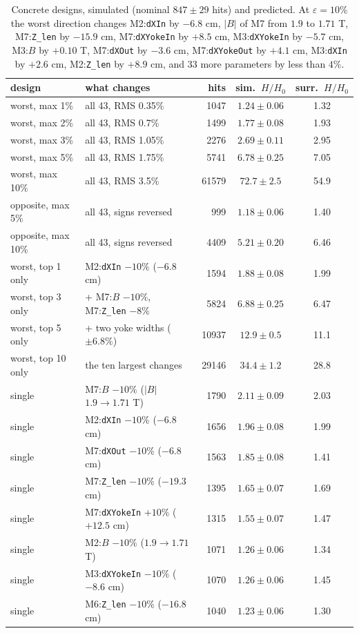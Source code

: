 \documentclass[11pt,a4paper]{article}
\newcommand{\HH}{H/H_0}
\begin{document}
\begin{table}[t]
\centering
\caption{Concrete designs, simulated (nominal $847\pm29$ hits) and predicted. At
$\varepsilon=10\%$ the worst direction changes M2:\texttt{dXIn} by $-6.8$ cm, $|B|$ of M7 from
$1.9$ to $1.71$ T, M7:\texttt{Z\_len} by $-15.9$ cm, M7:\texttt{dXYokeIn} by $+8.5$ cm,
M3:\texttt{dXYokeIn} by $-5.7$ cm, M3:$B$ by $+0.10$ T, M7:\texttt{dXOut} by $-3.6$ cm,
M7:\texttt{dXYokeOut} by $+4.1$ cm, M3:\texttt{dXIn} by $+2.6$ cm, M2:\texttt{Z\_len} by $+8.9$ cm,
and 33 more parameters by less than $4\%$.}
\label{tab:concrete}
\small
\begin{tabular}{llrcc}
\toprule
design & what changes & hits & sim.\ $\HH$ & surr.\ $\HH$ \\
\midrule
worst, max 1\%   & all 43, RMS 0.35\% & 1047  & $1.24\pm0.06$ & 1.32 \\
worst, max 2\%   & all 43, RMS 0.7\% & 1499  & $1.77\pm0.08$ & 1.93 \\
worst, max 3\%   & all 43, RMS 1.05\% & 2276  & $2.69\pm0.11$ & 2.95 \\
worst, max 5\%   & all 43, RMS 1.75\% & 5741  & $6.78\pm0.25$ & 7.05 \\
worst, max 10\%  & all 43, RMS 3.5\% & 61579 & $72.7\pm2.5$  & 54.9 \\
opposite, max 5\% & all 43, signs reversed & 999 & $1.18\pm0.06$ & 1.40 \\
opposite, max 10\% & all 43, signs reversed & 4409 & $5.21\pm0.20$ & 6.46 \\
\midrule
worst, top 1 only  & M2:\texttt{dXIn} $-10\%$ ($-6.8$ cm) & 1594 & $1.88\pm0.08$ & 1.99 \\
worst, top 3 only  & + M7:$B$ $-10\%$, M7:\texttt{Z\_len} $-8\%$ & 5824 & $6.88\pm0.25$ & 6.47 \\
worst, top 5 only  & + two yoke widths ($\pm6.8\%$) & 10937 & $12.9\pm0.5$ & 11.1 \\
worst, top 10 only & the ten largest changes & 29146 & $34.4\pm1.2$ & 28.8 \\
\midrule
single & M7:$B$ $-10\%$ ($|B|$ $1.9\to1.71$ T) & 1790 & $2.11\pm0.09$ & 2.03 \\
single & M2:\texttt{dXIn} $-10\%$ ($-6.8$ cm)   & 1656 & $1.96\pm0.08$ & 1.99 \\
single & M7:\texttt{dXOut} $-10\%$ ($-6.8$ cm)  & 1563 & $1.85\pm0.08$ & 1.41 \\
single & M7:\texttt{Z\_len} $-10\%$ ($-19.3$ cm) & 1395 & $1.65\pm0.07$ & 1.69 \\
single & M7:\texttt{dXYokeIn} $+10\%$ ($+12.5$ cm) & 1315 & $1.55\pm0.07$ & 1.47 \\
single & M2:$B$ $-10\%$ ($1.9\to1.71$ T) & 1071 & $1.26\pm0.06$ & 1.34 \\
single & M3:\texttt{dXYokeIn} $-10\%$ ($-8.6$ cm) & 1070 & $1.26\pm0.06$ & 1.45 \\
single & M6:\texttt{Z\_len} $-10\%$ ($-16.8$ cm) & 1040 & $1.23\pm0.06$ & 1.30 \\
\bottomrule
\end{tabular}
\end{table}
\end{document}
